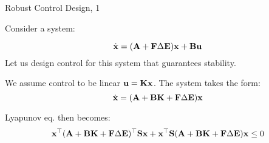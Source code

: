 \documentclass{beamer}
\begin{document}
\begin{frame}{Robust Control Design, 1}
	\begin{flushleft}
		
		Consider a system: 
		
		\begin{equation}
			\dot{\mathbf{x}}  = (\mathbf{A} + \mathbf{F} \Delta \mathbf{E})\mathbf{x} + \mathbf{B}\mathbf{u}
		\end{equation}
		Let us design control for this system that guarantees stability.
		
		\bigskip
		
		We assume control to be linear $\mathbf{u} = \mathbf{K}\mathbf{x}$. The system takes the form:
		\begin{equation}
			\dot{\mathbf{x}}  = (\mathbf{A} + \mathbf{B}\mathbf{K} + \mathbf{F} \Delta \mathbf{E})\mathbf{x}
		\end{equation}
		
		Lyapunov eq. then becomes:
		\begin{equation}
			\mathbf{x}^\top(\mathbf{A} + \mathbf{B}\mathbf{K} + \mathbf{F} \Delta \mathbf{E})^\top\mathbf{S}\mathbf{x}
			+
			\mathbf{x}^\top \mathbf{S} (\mathbf{A} + \mathbf{B}\mathbf{K} + \mathbf{F} \Delta \mathbf{E})\mathbf{x} \leq 0
		\end{equation}
		
		
		
	\end{flushleft}
\end{frame}
\end{document}
